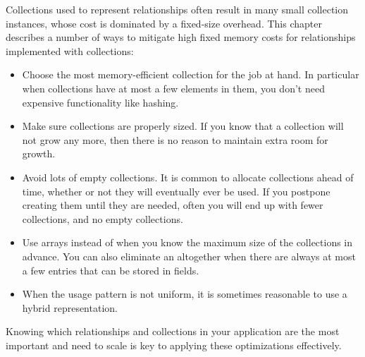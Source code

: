 Collections used to represent relationships often result in many small
collection instances, whose cost is dominated by a fixed-size
overhead. This chapter describes a number of ways to mitigate high fixed memory
costs for relationships implemented with collections:
\begin{itemize}
  \item Choose the most memory-efficient collection for the job at hand. In
  particular when collections have at most a few elements in them, you don't
  need expensive functionality like hashing. 
  \item Make sure collections are properly sized. If you know that a collection
  will not grow any more, then there is no reason to maintain extra room for
  growth.
  \item Avoid lots of empty collections. It is common to allocate collections 
 ahead of time, whether or not they will eventually ever be used. If you
 postpone creating them until they are needed, often you will end up with fewer collections, 
 and no empty collections.
 \item Use arrays instead of  when you know the maximum size
 of the collections in advance. You can also eliminate an
  altogether when there are always at most a few entries that
 can be stored in fields.
 \item When the usage pattern is not uniform, it is sometimes reasonable to use
 a hybrid representation.
\end{itemize}
Knowing which relationships and collections in your application are the most
important and need to scale is key to applying these optimizations effectively.  




